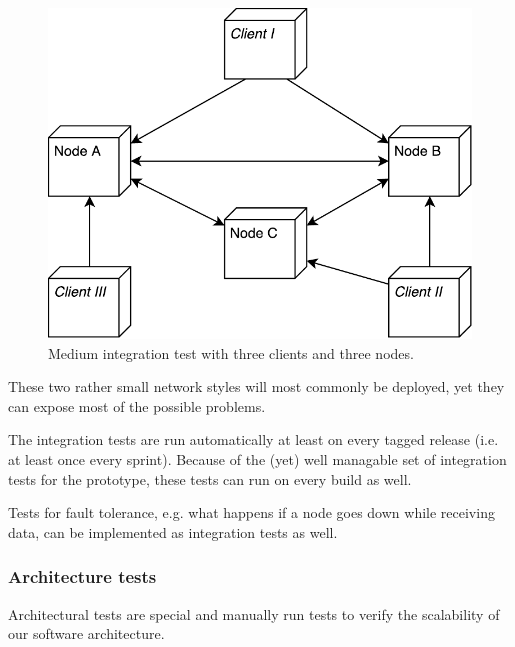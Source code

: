\begin{figure}
	\centering
	\includegraphics[width=0.5\linewidth]{resources/integration_test_medium}
	\caption[Medium integration test]{Medium integration test with three \glspl{client} and three \glspl{node}.}
	\label{fig:integrationtestmedium}
\end{figure}

These two rather small network styles will most commonly be deployed, yet they can expose most of the possible problems.

The integration tests are run automatically at least on every tagged release (i.e. at least once every sprint). Because of the (yet) well managable set of integration tests for the prototype, these tests can run on every build as well.

Tests for fault tolerance, e.g. what happens if a \gls{node} goes down while receiving data, can be implemented as integration tests as well.

\subsubsection{Architecture tests}

Architectural tests are special and manually run tests to verify the scalability of our software architecture.